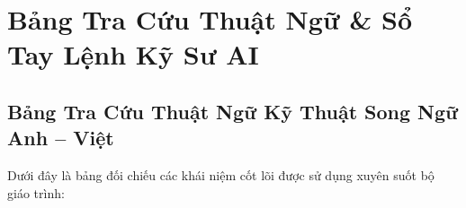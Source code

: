 
\chapter{Bảng Tra Cứu Thuật Ngữ \& Sổ Tay Lệnh Kỹ Sư AI}
\label{ch:appendix-glossary-cheatsheet}

\section{Bảng Tra Cứu Thuật Ngữ Kỹ Thuật Song Ngữ Anh -- Việt}
\label{sec:appendix-glossary}

Dưới đây là bảng đối chiếu các khái niệm cốt lõi được sử dụng xuyên suốt bộ giáo trình:


